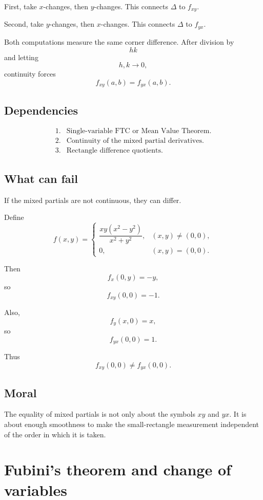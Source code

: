 First, take \(x\)-changes, then \(y\)-changes.  This connects \(\Delta\) to \(f_{xy}\).

Second, take \(y\)-changes, then \(x\)-changes.  This connects \(\Delta\) to \(f_{yx}\).

Both computations measure the same corner difference.  After division by
\[
    hk
\]
and letting
\[
    h,k\to0,
\]
continuity forces
\[
    f_{xy}(a,b)=f_{yx}(a,b).
\]

\subsection*{Dependencies}

\[
\begin{array}{ll}
1. & \text{Single-variable FTC or Mean Value Theorem.}\\[1mm]
2. & \text{Continuity of the mixed partial derivatives.}\\[1mm]
3. & \text{Rectangle difference quotients.}
\end{array}
\]

\subsection*{What can fail}

If the mixed partials are not continuous, they can differ.

Define
\[
    f(x,y)=
    \begin{cases}
    \dfrac{xy(x^2-y^2)}{x^2+y^2}, & (x,y)\ne(0,0),\\[2mm]
    0, & (x,y)=(0,0).
    \end{cases}
\]

Then
\[
    f_x(0,y)=-y,
\]
so
\[
    f_{xy}(0,0)=-1.
\]

Also,
\[
    f_y(x,0)=x,
\]
so
\[
    f_{yx}(0,0)=1.
\]

Thus
\[
\boxed{
    f_{xy}(0,0)\ne f_{yx}(0,0).
}
\]

\subsection*{Moral}

The equality of mixed partials is not only about the symbols \(xy\) and \(yx\).  It is
about enough smoothness to make the small-rectangle measurement independent of the
order in which it is taken.

\section{Fubini's theorem and change of variables}
\label{app:F.3}

